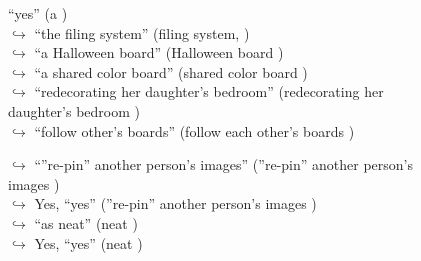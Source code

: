 \documentclass[11pt,a4paper, onecolumn]{article}
\begin{document}
\begin{figure}[t]
\begin{tcolorbox}[boxsep=0pt,left=5pt,right=0pt,top=2pt,colback = yellow!5]
\begin{dialogue}
{ ``yes'' (a ) }
\\
\colorbox{pink!25}{$\hookrightarrow$}
{ ``the filing system'' (filing system, ) }
\\
\colorbox{pink!25}{$\hookrightarrow$}
{ ``a Halloween board'' (Halloween board ) }
\\
\colorbox{pink!25}{$\hookrightarrow$}
{ ``a shared color board'' (shared color board ) }
\\
\colorbox{pink!25}{$\hookrightarrow$}
{ ``redecorating her daughter's bedroom'' (redecorating her daughter's bedroom ) }
\\
\colorbox{pink!25}{$\hookrightarrow$}
{ ``follow other's boards'' (follow each other's boards ) }
 \end{dialogue}\end{tcolorbox}\end{figure}\begin{figure}[t] \small \begin{tcolorbox}[boxsep=0pt,left=5pt,right=0pt,top=2pt,colback = yellow!5] \begin{dialogue}
 \small 
\colorbox{pink!25}{$\hookrightarrow$}
{ ``''re-pin'' another person's images'' (''re-pin'' another person's images ) }
\\
\colorbox{pink!25}{$\hookrightarrow$}
\colorbox{red!25}{Yes,}
{ ``yes'' (''re-pin'' another person's images ) }
\\
\colorbox{pink!25}{$\hookrightarrow$}
{ ``as neat'' (neat ) }
\\
\colorbox{pink!25}{$\hookrightarrow$}
\colorbox{red!25}{Yes,}
{ ``yes'' (neat ) }
\\
 \end{dialogue}\end{tcolorbox}\end{figure}
\end{document}
